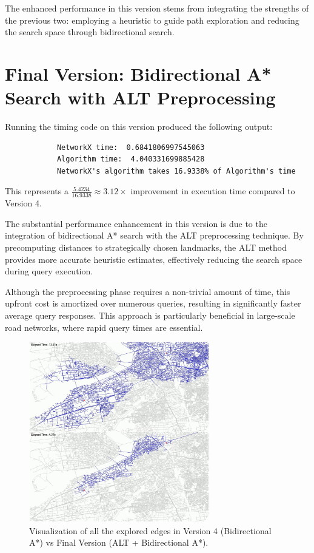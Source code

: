 	 	The enhanced performance in this version stems from integrating the strengths of the previous two: employing a heuristic to guide path exploration and reducing the search space through bidirectional search.
	 
	 \section{Final Version: Bidirectional A* Search with ALT Preprocessing}
	 	Running the timing code on this version produced the following output:
	 	\begin{verbatim}
	 		NetworkX time:  0.6841806997545063
	 		Algorithm time:  4.040331699885428
	 		NetworkX's algorithm takes 16.9338% of Algorithm's time
	 	\end{verbatim}
	 	
	 	This represents a \(\frac{5.4234}{16.9338} \approx 3.12\times\) improvement in execution time compared to Version 4. \vspace{4mm}
	 	
	 	The substantial performance enhancement in this version is due to the integration of bidirectional A* search with the ALT preprocessing technique. By precomputing distances to strategically chosen landmarks, the ALT method provides more accurate heuristic estimates, effectively reducing the search space during query execution.\vspace{4mm}
	 	
	 	Although the preprocessing phase requires a non-trivial amount of time, this upfront cost is amortized over numerous queries, resulting in significantly faster average query responses. This approach is particularly beneficial in large-scale road networks, where rapid query times are essential.
	 	
	 	\begin{figure}[H]
	 		\centering
	 		\includegraphics[width=0.7\textwidth]{final_vs_biastar.png}
	 		\caption{Visualization of all the explored edges in Version 4 (Bidirectional A*) vs Final Version (ALT + Bidirectional A*).}
	 		\label{fig:bidirectional_astar_vs_final}
	 	\end{figure}
	 	
